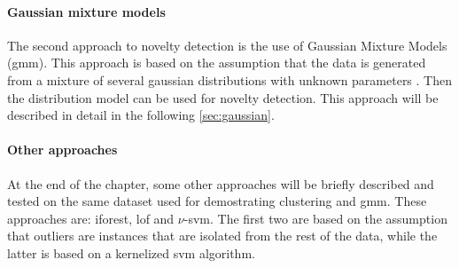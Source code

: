 \paragraph[]{Gaussian mixture models}
The second approach to novelty detection is the use of Gaussian Mixture Models (\gls{gmm}). This approach is based on the assumption that the data is generated from a mixture of several gaussian distributions with unknown parameters . Then the distribution model can be used for novelty detection. This approach will be described in detail in the following \autoref{sec:gaussian}.

\paragraph{Other approaches}
At the end of the chapter, some other approaches will be briefly described and tested on the same dataset used for demostrating clustering and \gls{gmm}. These approaches are: \gls{iforest}, \gls{lof} and $\nu$-\gls{svm}. The first two are based on the assumption that outliers are instances that are isolated from the rest of the data, while the latter is based on a kernelized \gls{svm} algorithm. 







